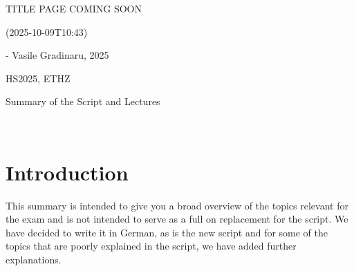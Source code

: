 \documentclass{article}
\begin{document}
\startDocument
\usetcolorboxes
\setcounter{numberingConfig}{3}
\setcounter{numberSubsections}{1}

\vspace{2cm}
\begin{Huge}
    \begin{center}
        TITLE PAGE COMING SOON
    \end{center}
\end{Huge}


\vspace{4cm}
\begin{center}
    \begin{Large}
         (2025-10-09T10:43) %
    \end{Large}

    \hspace{3cm} - Vasile Gradinaru, 2025
\end{center}

\vspace{3cm}
\begin{center}
    HS2025, ETHZ\\[0.2cm]
    \begin{Large}
        Summary of the Script and Lectures
    \end{Large}\\[0.2cm]
\end{center}



\newpage
{}



\newpage
\setcounter{section}{-1}
\section{Introduction}
This summary is intended to give you a broad overview of the topics relevant for the exam and is not intended to serve as a full on replacement for the script.
We have decided to write it in German, as is the new script and for some of the topics that are poorly explained in the script, we have added further explanations.
\end{document}
